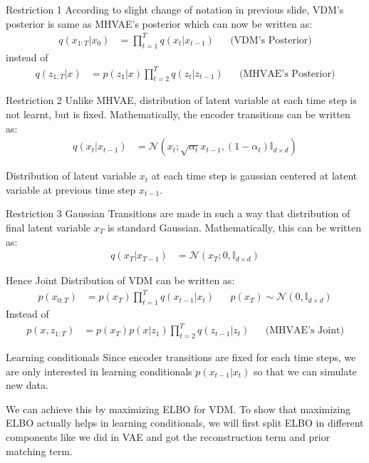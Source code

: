 \begin{frame}{Restriction 1}
    According to slight change of notation in previous slide, VDM's posterior is same as MHVAE's posterior which can now be written as:
    \begin{align*}
        q(x_{1:T}|x_0) &= \prod_{t=1}^{T} q(x_t|x_{t-1}) && \text{(VDM's Posterior)}
    \end{align*}
    instead of 
    \begin{align*}
        q(z_{1:T}|x) &= p(z_1|x) \prod_{t=2}^{T} q(z_t|z_{t-1}) && \text{(MHVAE's Posterior)}
    \end{align*}
\end{frame}

\begin{frame}{Restriction 2}
    Unlike MHVAE, distribution of latent variable at each time step is not learnt, but is fixed. Mathematically, the encoder transitions can be written as:
    \begin{align*}
        q(x_t|x_{t-1}) &= \mathcal{N}(x_t; \sqrt{\alpha_t}x_{t-1}, (1-\alpha_t) \mathbb{I}_{d \times d}) 
    \end{align*}

    Distribution of latent variable $x_t$ at each time step is gaussian centered at latent variable at previous time step $x_{t-1}$.
\end{frame}

\begin{frame}{Restriction 3}
    Gaussian Transitions are made in such a way that distribution of final latent variable $x_T$ is standard Gaussian. Mathematically, this can be written as:
    \begin{align*}
        q(x_T|x_{T-1}) &= \mathcal{N}(x_T; 0, \mathbb{I}_{d \times d})
    \end{align*}

    Hence Joint Distribution of VDM can be written as:
    \begin{align*}
        p(x_{0:T}) &= p(x_T) \prod_{t=1}^{T} q(x_{t-1}|x_{t}) && p(x_T) \sim \mathcal{N}(0, \mathbb{I}_{d \times d})
    \end{align*}
    Instead of
    \begin{align*}
        p(x,z_{1:T}) &= p(x_T)p(x|z_1) \prod_{t=2}^{T} q(z_{t-1}|z_{t}) && \text{(MHVAE's Joint)}
    \end{align*}
\end{frame}

\begin{frame}{Learning conditionals}
    Since encoder transitions are fixed for each time steps, we are only interested in learning conditionals $p(x_{t-1}|x_t)$ so that we can simulate new data. 

    \bigskip

    We can achieve this by maximizing ELBO for VDM. To show that maximizing ELBO actually helps in learning conditionals, we will first split ELBO in different components like we did in VAE and got the reconstruction term and prior matching term.
\end{frame}

